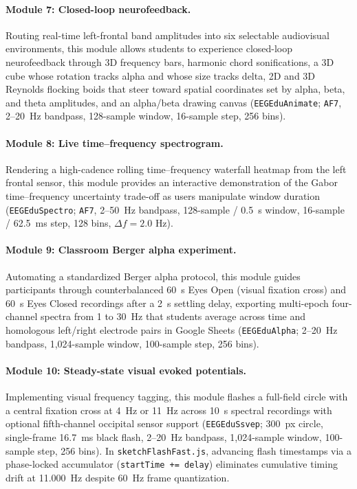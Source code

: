 \documentclass[11pt,letterpaper]{article}
\begin{document}
\paragraph{Module 7: Closed-loop neurofeedback.} Routing real-time left-frontal band amplitudes into six selectable audiovisual environments, this module allows students to experience closed-loop neurofeedback through 3D frequency bars, harmonic chord sonifications, a 3D cube whose rotation tracks alpha and whose size tracks delta, 2D and 3D Reynolds flocking boids that steer toward spatial coordinates set by alpha, beta, and theta amplitudes, and an alpha/beta drawing canvas (\texttt{EEGEduAnimate}; \texttt{AF7}, 2--20~Hz bandpass, 128-sample window, 16-sample step, 256 bins).

\paragraph{Module 8: Live time--frequency spectrogram.} Rendering a high-cadence rolling time--frequency waterfall heatmap from the left frontal sensor, this module provides an interactive demonstration of the Gabor time--frequency uncertainty trade-off as users manipulate window duration (\texttt{EEGEduSpectro}; \texttt{AF7}, 2--50~Hz bandpass, 128-sample / 0.5~s window, 16-sample / 62.5~ms step, 128 bins, $\Delta f = 2.0\text{ Hz}$).

\paragraph{Module 9: Classroom Berger alpha experiment.} Automating a standardized Berger alpha protocol, this module guides participants through counterbalanced 60~s Eyes Open (visual fixation cross) and 60~s Eyes Closed recordings after a 2~s settling delay, exporting multi-epoch four-channel spectra from 1 to 30~Hz that students average across time and homologous left/right electrode pairs in Google Sheets (\texttt{EEGEduAlpha}; 2--20~Hz bandpass, 1,024-sample window, 100-sample step, 256 bins).

\paragraph{Module 10: Steady-state visual evoked potentials.} Implementing visual frequency tagging, this module flashes a full-field circle with a central fixation cross at 4~Hz or 11~Hz across 10~s spectral recordings with optional fifth-channel occipital sensor support (\texttt{EEGEduSsvep}; 300~px circle, single-frame 16.7~ms black flash, 2--20~Hz bandpass, 1,024-sample window, 100-sample step, 256 bins). In \texttt{sketchFlashFast.js}, advancing flash timestamps via a phase-locked accumulator (\texttt{startTime += delay}) eliminates cumulative timing drift at 11.000~Hz despite 60~Hz frame quantization.
\end{document}

